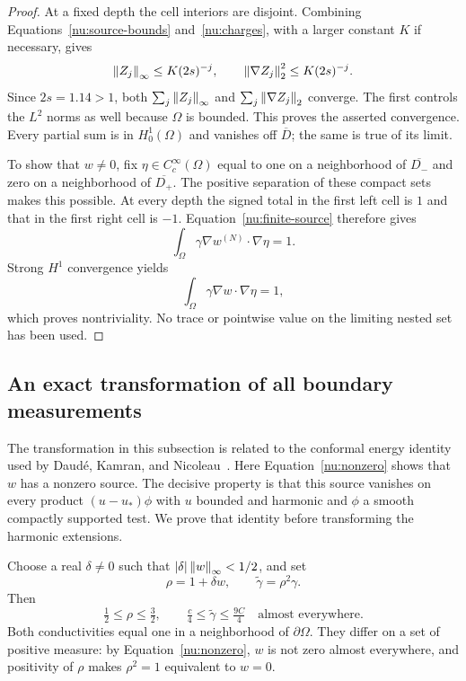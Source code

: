 \begin{proof}
At a fixed depth the cell interiors are disjoint. Combining
Equations~\eqref{nu:source-bounds} and~\eqref{nu:charges}, with a
larger constant \(K\) if necessary, gives
\begin{equation}\label{nu:level-bounds}
 \left\lVert Z_j\right\rVert_\infty\le K(2s)^{-j},\qquad
 \left\lVert \nabla Z_j\right\rVert_2^2\le K(2s)^{-j}.
\end{equation}
Since \(2s=1.14>1\), both
\(\sum_j\left\lVert Z_j\right\rVert_\infty\) and
\(\sum_j\left\lVert \nabla Z_j\right\rVert_2\) converge. The first controls the
\(L^2\) norms as well because \(\Omega\) is bounded. This proves
the asserted convergence. Every partial sum is in \(H^1_0(\Omega)\)
and vanishes off \(\overline D\); the same is true of its limit.

To show that \(w\ne0\), fix
\(\eta\in C_c^\infty(\Omega)\) equal to one on a neighborhood
of \(\overline{D_-}\) and zero on a neighborhood of
\(\overline{D_+}\). The positive separation of these compact sets
makes this possible. At every depth the signed total in the first
left cell is \(1\) and that in the first right cell is \(-1\).
Equation~\eqref{nu:finite-source} therefore gives
\[
 \int_\Omega\gamma\nabla w^{(N)}\cdot\nabla\eta=1.
\]
Strong \(H^1\) convergence yields
\begin{equation}\label{nu:nonzero}
 \int_\Omega\gamma\nabla w\cdot\nabla\eta=1,
\end{equation}
which proves nontriviality. No trace or pointwise value on the limiting
nested set has been used.
\end{proof}

\subsection{An exact transformation of all boundary measurements}

The transformation in this subsection is related to the conformal
energy identity used by Daud\'e, Kamran, and
Nicoleau~\cite[Proposition~1.2]{DaudeKamranNicoleau}.
Here Equation~\eqref{nu:nonzero} shows that $w$ has a nonzero source.
The decisive property is that this source vanishes on every product
$(u-u_*)\phi$ with $u$ bounded and harmonic and $\phi$ a smooth compactly
supported test. We prove that identity before transforming the
harmonic extensions.

Choose a real \(\delta\ne0\) such that
\(\left\lvert \delta\right\rvert\left\lVert w\right\rVert_\infty<1/2\), and set
\begin{equation}\label{nu:new-coefficient}
 \rho=1+\delta w,\qquad \widetilde\gamma=\rho^2\gamma.
\end{equation}
Then
\begin{equation}\label{nu:ellipticity}
 \tfrac12\le\rho\le\tfrac32,
 \qquad \tfrac c4\le\widetilde\gamma\le\tfrac{9C}4
 \quad\text{almost everywhere}.
\end{equation}
Both conductivities equal one in a neighborhood of \(\partial\Omega\).
They differ on a set of positive measure: by
Equation~\eqref{nu:nonzero}, \(w\) is not zero almost everywhere,
and positivity of \(\rho\) makes \(\rho^2=1\) equivalent to
\(w=0\).

